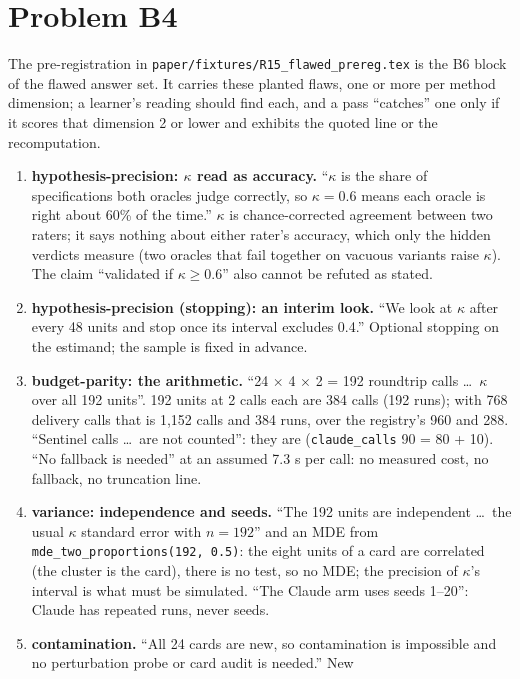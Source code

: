 \documentclass[11pt]{article}
\begin{document}
\section*{Problem B4}\label{ans:B4}
\begin{answer}
The pre-registration in \texttt{paper/fixtures/R15\_flawed\_prereg.tex} is the
B6 block of the flawed answer set. It carries these planted flaws, one or more
per method dimension; a learner's reading should find each, and a pass
``catches'' one only if it scores that dimension 2 or lower and exhibits the
quoted line or the recomputation.
\begin{enumerate}
\item \textbf{hypothesis-precision: $\kappa$ read as accuracy.} ``$\kappa$ is
the share of specifications both oracles judge correctly, so $\kappa = 0.6$
means each oracle is right about 60\% of the time.'' $\kappa$ is
chance-corrected agreement between two raters; it says nothing about either
rater's accuracy, which only the hidden verdicts measure (two oracles that fail
together on vacuous variants raise $\kappa$). The claim ``validated if
$\kappa\ge0.6$'' also cannot be refuted as stated.
\item \textbf{hypothesis-precision (stopping): an interim look.} ``We look at
$\kappa$ after every 48 units and stop once its interval excludes 0.4.''
Optional stopping on the estimand; the sample is fixed in advance.
\item \textbf{budget-parity: the arithmetic.} ``24 $\times$ 4 $\times$ 2 = 192
roundtrip calls \ldots\ $\kappa$ over all 192 units''. 192 units at 2 calls each
are 384 calls (192 runs); with 768 delivery calls that is 1,152 calls and 384
runs, over the registry's 960 and 288. ``Sentinel calls \ldots\ are not
counted'': they are (\texttt{claude\_calls} 90 = 80 + 10). ``No fallback is
needed'' at an assumed 7.3 s per call: no measured cost, no fallback, no
truncation line.
\item \textbf{variance: independence and seeds.} ``The 192 units are
independent \ldots\ the usual $\kappa$ standard error with $n=192$'' and an MDE
from \texttt{mde\_two\_proportions(192, 0.5)}: the eight units of a card are
correlated (the cluster is the card), there is no test, so no MDE; the
precision of $\kappa$'s interval is what must be simulated. ``The Claude arm
uses seeds 1--20'': Claude has repeated runs, never seeds.
\item \textbf{contamination.} ``All 24 cards are new, so contamination is
impossible and no perturbation probe or card audit is needed.'' New

\end{enumerate}
\end{answer}
\end{document}
